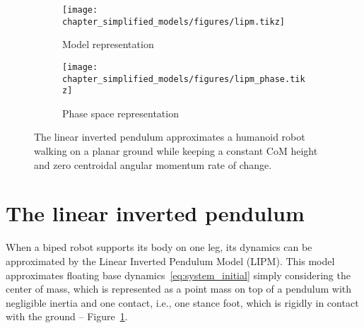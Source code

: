 
\begin{figure}[tpb]
\centering
    \begin{subfigure}[b]{0.48\textwidth}
        \centering
        \texttt{[image: chapter\_simplified\_models/figures/lipm.tikz]}
        \caption{Model representation}
        \label{fig:lipm}
    \end{subfigure}
    \hfill
    \begin{subfigure}[b]{0.48\textwidth}
        \centering
        \texttt{[image: chapter\_simplified\_models/figures/lipm\_phase.tikz]}
        \caption{Phase space representation}
        \label{fig:lipm_phase}
    \end{subfigure}
	\caption[The linear inverted pendulum model.]{The linear inverted pendulum approximates a humanoid robot walking on a planar ground while keeping a constant CoM height and zero centroidal angular momentum rate of change.}
\end{figure}

\section{The linear inverted pendulum}\label{sec:lip}
When a biped robot supports its body on one leg, its dynamics can be approximated by the Linear Inverted Pendulum Model (LIPM). This model approximates floating base dynamics~\eqref{eq:system_initial} simply considering the center of mass, which is represented as a point mass on top of a pendulum with negligible inertia and one contact, i.e., one stance foot, which is rigidly in contact with the ground -- Figure~\ref{fig:lipm}.

